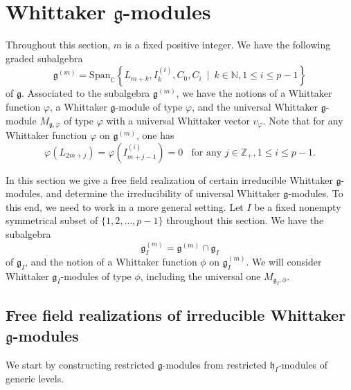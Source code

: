 \documentclass[12pt, reqno]{amsart}
\numberwithin{equation}{section}
\numberwithin{equation}{section}
\def\h{\mathfrak{h}}
\def\g{\mathfrak{g}}
\def\vf{\varphi}
\def\vvf{v_{\vf}}
\def\({\left(}
\def\){\right)}
\newcommand{\C}{\mathbb C}
\newcommand{\N}{\mathbb{N}}
\newcommand{\Z}{\mathbb{Z}}
\newcommand{\spanc}[1]{\mathrm{Span}_{\C}\left\{#1\right\}}
\newcommand{\elei}[2]{I_{#1}^{(#2)}}
\begin{document}
\section{Whittaker $\g$-modules}
Throughout this section, $m$ is a fixed positive integer. We have the following graded subalgebra
$$\g^{(m)}=\spanc{L_{m+k},\elei ki,C_0,C_i\ \mid\ k\in\N,1\leq i\leq p-1}$$
of $\g$.
Associated to the subalgebra $\g^{(m)}$, we  have the notions of a Whittaker function $\varphi$,
a Whittaker $\g$-module of type $\varphi$, and the  universal Whittaker $\g$-module
$M_{\g,\varphi}$ of type $\varphi$ with a universal Whittaker vector $\vvf$.
Note that for any Whittaker function $\varphi$ on $\g^{(m)}$, one has
\begin{equation}\label{eq3.1}
\vf(L_{2m+j})=\vf\(\elei {m+j-1}i\)=0\ \ \ \ \text{for any }j\in\Z_+, 1\le i\le p-1.
\end{equation}

In this section we give a free field realization of certain irreducible Whittaker $\g$-modules, and
determine the irreducibility of universal Whittaker $\g$-modules. To this end, we need to work in a more general setting.
Let $I$ be a fixed nonempty symmetrical subset  of $\{1,2,\dots,p-1\}$ throughout this section.
We have the subalgebra
\[
\g_I^{(m)}=\g^{(m)}\cap \g_I
\]
of $\g_I$, and the notion of a Whittaker function $\phi$ on $\g_I^{(m)}$.
We will consider Whittaker $\g_I$-modules of type $\phi$, including the universal one $M_{\g_I,\phi}$.





\subsection{Free field realizations of irreducible Whittaker $\g$-modules}
We start by constructing restricted $\g$-modules from restricted $\h_I$-modules of generic levels.
\end{document}
